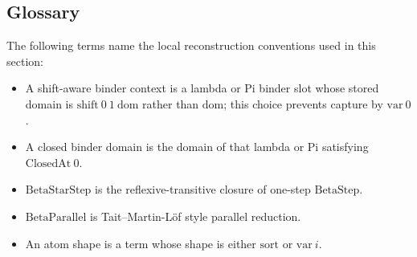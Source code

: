 \subsection{Glossary}\label{subsec:reconstruction-glossary}

The following terms name the local reconstruction conventions used in this
section:
\begin{itemize}
  \item A shift-aware binder context is a lambda or Pi binder slot whose stored
    domain is $\mathrm{shift}\ 0\ 1\ \mathrm{dom}$ rather than
    $\mathrm{dom}$; this choice prevents capture by $\mathrm{var}\ 0$.
  \item A closed binder domain is the domain of that lambda or Pi satisfying
    $\mathrm{ClosedAt}\ 0$.
  \item $\mathrm{BetaStarStep}$ is the reflexive-transitive closure of one-step
    $\mathrm{BetaStep}$.
  \item $\mathrm{BetaParallel}$ is Tait--Martin-L\"of style parallel reduction.
  \item An atom shape is a term whose shape is either $\mathrm{sort}$ or
    $\mathrm{var}\ i$.
\end{itemize}
